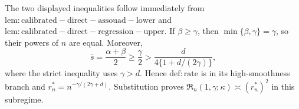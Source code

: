 The two displayed inequalities follow immediately from \(\mathrm{lem:calibrated-direct-assouad-lower}\) and \(\mathrm{lem:calibrated-direct-regression-upper}\). If \(\beta\ge\gamma\), then \(\min\{\beta,\gamma\}=\gamma\), so their powers of \(n\) are equal. Moreover,
\[
 \bar s=\frac{\alpha+\beta}{2}\ge\frac\gamma2
 >\frac d{4\{1+d/(2\gamma)\}},
\]
where the strict inequality uses \(\gamma>d\). Hence \(\mathrm{def:rate}\) is in its high-smoothness branch and \(r_n^*=n^{-\gamma/(2\gamma+d)}\). Substitution proves \(\mathfrak R_n(1,\gamma;\kappa)\asymp(r_n^*)^2\) in this subregime.